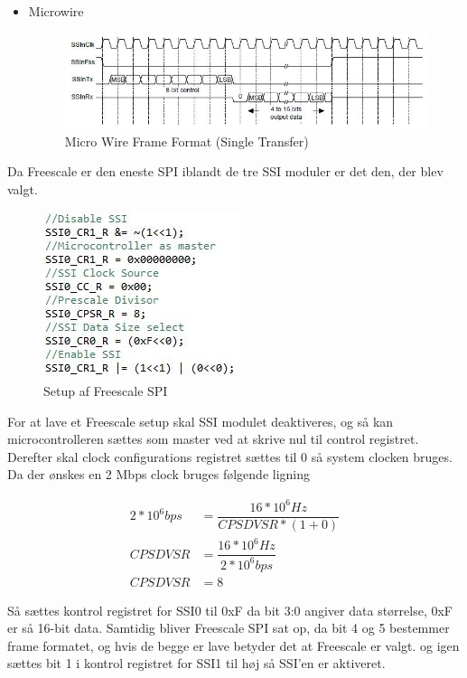 \begin{itemize}
	\item Microwire
		\begin{figure}[ht]
			\begin{center}
			\includegraphics[scale=0.8]{Billeder/MW_Frame_format.jpg}
			\end{center}
			\caption{Micro Wire Frame Format (Single Transfer)}
			\label{fig:MWFrameFormat}
		\end{figure}
\end{itemize}

Da Freescale er den eneste SPI iblandt de tre SSI moduler er det den, der blev valgt.

		\begin{figure}[ht]
			\begin{center}
			\includegraphics[scale=0.8]{Billeder/Spi_Setup.jpg}
			\end{center}
			\label{fig:SPI_Setup}
			\caption{Setup af Freescale SPI}
		\end{figure}

For at lave et Freescale setup skal SSI modulet deaktiveres, og så kan microcontrolleren sættes som master ved at skrive nul til control registret.
Derefter skal clock configurations registret sættes til 0 så system clocken bruges.
Da der ønskes en 2 Mbps clock bruges følgende ligning

\begin{align*}
2*10^6 bps &= \dfrac{16*10^6 Hz}{CPSDVSR * (1 + 0)}\\
CPSDVSR &= \dfrac{16*10^6 Hz}{2*10^6 bps}\\
CPSDVSR &= 8
\end{align*}

Så sættes kontrol registret for SSI0 til 0xF da bit 3:0 angiver data størrelse, 0xF er så 16-bit data. Samtidig bliver Freescale SPI sat op, da bit 4 og 5 bestemmer frame formatet, og hvis de begge er lave betyder det at Freescale er valgt. 
og igen sættes bit 1 i kontrol registret for SSI1 til høj så SSI'en er aktiveret.

